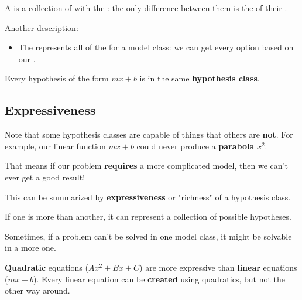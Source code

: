         \begin{definition}
            A  is a collection of  with the : the only difference between them is the  of their .
            
            Another description:
            \begin{itemize}
                \item The  represents all of the  for a model class: we can get every option based on our .
            \end{itemize}
        \end{definition}
        
        
        \miniex Every hypothesis of the form $mx+b$ is in the same \textbf{hypothesis class}.
    
    \subsection{Expressiveness}
    
        Note that some hypothesis classes are capable of things that others are \textbf{not}. For example, our linear function $mx+b$ could never produce a \textbf{parabola} $x^2$.
        
        That means if our problem \textbf{requires} a more complicated model, then we can't ever get a good result!
        
        This can be summarized by \textbf{expressiveness} or "richness" of a hypothesis class.\\
        
        \begin{definition}
            If one  is more  than another, it can represent a  collection of possible hypotheses.
            
            Sometimes, if a problem can't be solved in one model class, it might be solvable in a more  one.
        \end{definition}
        
        \miniex \textbf{Quadratic} equations ($Ax^2+Bx+C$) are more expressive than \textbf{linear} equations ($mx+b$). Every linear equation can be \textbf{created} using quadratics, but not the other way around.
        
